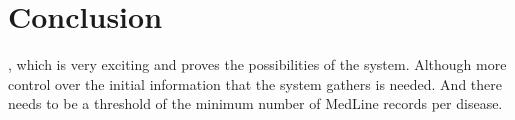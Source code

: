 \chapter{Conclusion}


, which is very exciting and proves the
possibilities of the system. Although more control over the initial
information that the system gathers is needed. And there needs to be a
threshold of the minimum number of MedLine records per disease.\\
